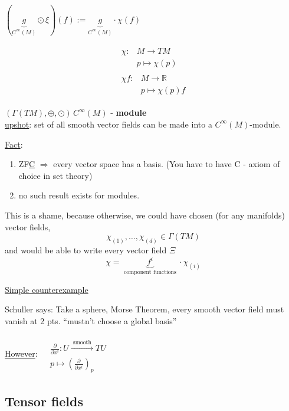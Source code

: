 \documentclass[10pt]{amsart}
\begin{document}
\begin{multicols*}{2}
	$(\underbrace{g}_{ C^{\infty}(M)} \odot \xi)(f) := \underbrace{ g }_{C^{\infty}(M)} \cdot \chi(f)$

\[
\begin{gathered}
\begin{aligned}
\chi :& M \to TM \\
& p \mapsto \chi(p)
\end{aligned} \\
\begin{aligned}
\chi f : & M \to \mathbb{R} \\ 
& p \mapsto \chi(p) f
\end{aligned}
\end{gathered}
\]
	
$(\Gamma(TM), \oplus , \odot) \, C^{\infty}(M)$ - \textbf{module} \\

	
	\underline{upshot}: set of all smooth vector fields can be made into a $C^{\infty}(M)$-module.  
	
	\underline{Fact}: \begin{enumerate}
		\item[(1)] ZF\underline{C} $\Longrightarrow $ every vector space has a basis. (You have to have C - axiom of choice in set theory)
		\item[(2)] no such result exists for modules.  
	\end{enumerate}
	
	This is a shame, because otherwise, we could have chosen (for any manifolds) vector fields, 
	\[
	\chi_{(1)}, \dots , \chi_{(d)} \in \Gamma(TM)
	\]
	and would be able to write every vector field $\Xi$
	\[
	\chi = \underbrace{ f^i }_{\text{ component functions } } \cdot \chi_{(i)}
	\]
	
	\underline{Simple counterexample}
	
	Schuller says: Take a sphere, Morse Theorem, every smooth vector field must vanish at 2 pts. ``mustn't choose a global basis''
	
	
	\underline{However}: $\begin{aligned} & \quad \\
	& \frac{ \partial }{ \partial x^i} : U \xrightarrow{ \text{ smooth }} TU \\
	& p \mapsto \left( \frac{ \partial }{ \partial x^i } \right)_p
	\end{aligned}$
	
	\subsection{Tensor fields}
	

\end{multicols*}
\end{document}
